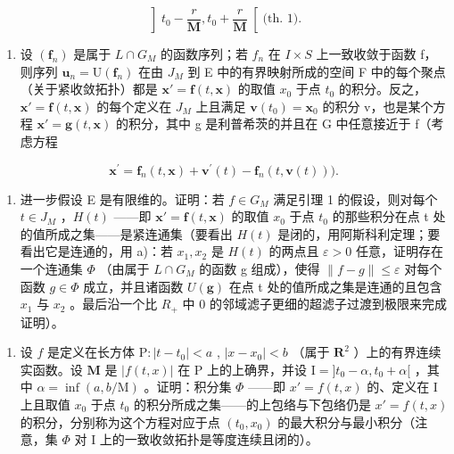 \[
\left] t _ {0} - \frac {r}{\mathbf {M}}, t _ {0} + \frac {r}{\mathbf {M}} \right[ \text {(th. 1).}
\]

\begin{enumerate}
\def\labelenumi{\alph{enumi})}
\tightlist
\item
  设 \((\mathbf{f}_{n})\) 是属于 \(L \cap G_{M}\) 的函数序列；若 \(f_{n}\) 在 \(I \times S\) 上一致收敛于函数 f，则序列 \(\mathbf{u}_{n} = \mathrm{U}(\mathbf{f}_{n})\) 在由 \(J_{M}\) 到 E 中的有界映射所成的空间 F 中的每个聚点（关于紧收敛拓扑）都是 \(\mathbf{x}' = \mathbf{f}(t, \mathbf{x})\) 的取值 \(x_{0}\) 于点 \(t_{0}\) 的积分。反之，\(\mathbf{x}' = \mathbf{f}(t, \mathbf{x})\) 的每个定义在 \(J_{M}\) 上且满足 \(\mathbf{v}(t_{0}) = \mathbf{x}_{0}\) 的积分 v，也是某个方程 \(\mathbf{x}' = \mathbf{g}(t, \mathbf{x})\) 的积分，其中 g 是利普希茨的并且在 G 中任意接近于 f（考虑方程
\end{enumerate}

\[
\mathbf {x} ^ {\prime} = \mathbf {f} _ {n} (t, \mathbf {x}) + \mathbf {v} ^ {\prime} (t) - \mathbf {f} _ {n} (t, \mathbf {v} (t))).
\]

\begin{enumerate}
\def\labelenumi{\alph{enumi})}
\setcounter{enumi}{1}
\tightlist
\item
  进一步假设 E 是有限维的。证明：若 \(f \in G_{M}\) 满足引理 1 的假设，则对每个 \(t \in J_{M}\) ，\(H(t)\) ——即 \(\mathbf{x}' = \mathbf{f}(t, \mathbf{x})\) 的取值 \(x_{0}\) 于点 \(t_{0}\) 的那些积分在点 t 处的值所成之集——是紧连通集（要看出 \(H(t)\) 是闭的，用阿斯科利定理；要看出它是连通的，用 a)：若 \(x_{1}, x_{2}\) 是 \(H(t)\) 的两点且 \(\varepsilon > 0\) 任意，证明存在一个连通集 \(\Phi\) （由属于 \(L \cap G_{M}\) 的函数 g 组成），使得 \(\|f - g\| \leqslant \varepsilon\) 对每个函数 \(g \in \Phi\) 成立，并且诸函数 \(U(\mathbf{g})\) 在点 t 处的值所成之集是连通的且包含 \(x_{1}\) 与 \(x_{2}\) 。最后沿一个比 \(R_{+}\) 中 0 的邻域滤子更细的超滤子过渡到极限来完成证明）。
\end{enumerate}

\begin{enumerate}
\def\labelenumi{\arabic{enumi})}
\setcounter{enumi}{9}
\tightlist
\item
  设 \(f\) 是定义在长方体 \(\mathrm{P}: |t - t_0| < a\) , \(|x - x_0| < b\) （属于 \(\mathbf{R}^2\) ）上的有界连续实函数。设 \(\mathbf{M}\) 是 \(|f(t,x)|\) 在 \(\mathrm{P}\) 上的上确界，并设 \(\mathrm{I} = ]t_0 - \alpha, t_0 + \alpha[\) ，其中 \(\alpha = \inf(a, b/\mathrm{M})\) 。证明：积分集 \(\Phi\) ——即 \(x' = f(t,x)\) 的、定义在 \(\mathrm{I}\) 上且取值 \(x_0\) 于点 \(t_0\) 的积分所成之集——的上包络与下包络仍是 \(x' = f(t,x)\) 的积分，分别称为这个方程对应于点 \((t_0, x_0)\) 的最大积分与最小积分（注意，集 \(\Phi\) 对 \(\mathrm{I}\) 上的一致收敛拓扑是等度连续且闭的）。
\end{enumerate}


